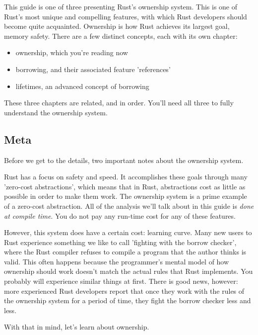 This guide is one of three presenting Rust's ownership system. This is one of Rust's most unique and compelling features, with 
which Rust developers should become quite acquainted. Ownership is how Rust achieves its largest goal, memory safety. There are 
a few distinct concepts, each with its own chapter:

\begin{itemize}
  \item{ownership, which you're reading now}
  \item{borrowing, and their associated feature 'references'}
  \item{lifetimes, an advanced concept of borrowing}
\end{itemize}

These three chapters are related, and in order. You'll need all three to fully understand the ownership system.

\subsection*{Meta}

Before we get to the details, two important notes about the ownership system.

\blank

Rust has a focus on safety and speed. It accomplishes these goals through many 'zero-cost abstractions', which means that in 
Rust, abstractions cost as little as possible in order to make them work. The ownership system is a prime example of a zero-cost
abstraction. All of the analysis we'll talk about in this guide is \emph{done at compile time}. You do not pay any run-time cost 
for any of these features.

\blank

However, this system does have a certain cost: learning curve. Many new users to Rust experience something we like to call 
'fighting with the borrow checker', where the Rust compiler refuses to compile a program that the author thinks is valid. 
This often happens because the programmer's mental model of how ownership should work doesn't match the actual rules that Rust 
implements. You probably will experience similar things at first. There is good news, however: more experienced Rust developers 
report that once they work with the rules of the ownership system for a period of time, they fight the borrow checker less and less.

\blank

With that in mind, let's learn about ownership.

